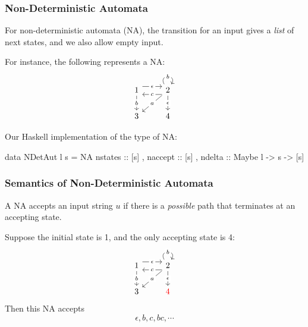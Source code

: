 \documentclass{beamer}
\begin{document}
  \begin{frame}[fragile]
    \frametitle{Non-Deterministic Automata}
    For non-deterministic automata (NA), the transition for an input gives a \emph{list} of next states, and we also allow empty input. \pause
    
    For instance, the following represents a NA:
    \[
      \begin{tikzcd}
        1 & 2 \\
        3 & 4
        \arrow["\epsilon"{description}, shift left=2, from=1-1, to=1-2]
        \arrow["b"{description}, from=1-1, to=2-1]
        \arrow["c"{description}, shift left=2, from=1-2, to=1-1]
        \arrow["b"{description}, from=1-2, to=1-2, loop, in=60, out=120, distance=5mm]
        \arrow["a"{description}, from=1-2, to=2-1]
        \arrow["\epsilon"{description}, from=1-2, to=2-2] 
      \end{tikzcd}
    \]
    \vspace{-\baselineskip} \pause

    Our Haskell implementation of the type of NA:
    \begin{showCode}
data NDetAut l s = NA { nstates :: [s]
                      , naccept :: [s]
                      , ndelta :: Maybe l -> s -> [s] }
    \end{showCode}
  \end{frame}

  \begin{frame}[fragile]
    \frametitle{Semantics of Non-Deterministic Automata}
    \begin{definition}
      A NA accepts an input string $u$ if there is a \emph{possible} path that terminates at an accepting state.
    \end{definition} \pause

    Suppose the initial state is 1, and the only accepting state is 4:
    \[
      \begin{tikzcd}
        1 & 2 \\
        3 & {\color{red} 4}
        \arrow["\epsilon"{description}, shift left=2, from=1-1, to=1-2]
        \arrow["b"{description}, from=1-1, to=2-1]
        \arrow["c"{description}, shift left=2, from=1-2, to=1-1]
        \arrow["b"{description}, from=1-2, to=1-2, loop, in=60, out=120, distance=5mm]
        \arrow["a"{description}, from=1-2, to=2-1]
        \arrow["\epsilon"{description}, from=1-2, to=2-2] 
      \end{tikzcd}
    \]
    Then this NA accepts 
    \[ \epsilon, b, c, bc, \cdots \]
  \end{frame}
\end{document}
